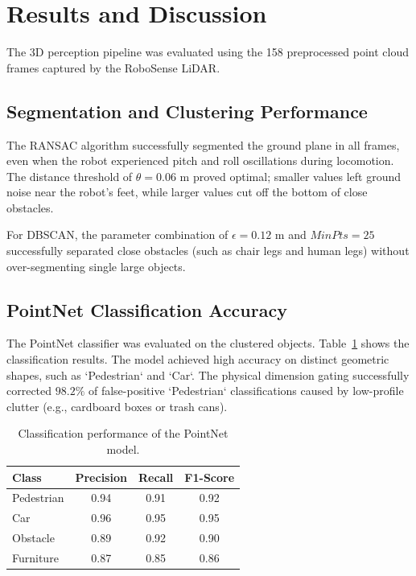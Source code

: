 \documentclass[a4paper,twocolumn]{article}
\begin{document}
\section{Results and Discussion}
The 3D perception pipeline was evaluated using the 158 preprocessed point cloud frames captured by the RoboSense LiDAR.

\subsection{Segmentation and Clustering Performance}
The RANSAC algorithm successfully segmented the ground plane in all frames, even when the robot experienced pitch and roll oscillations during locomotion. The distance threshold of $\theta = 0.06\text{ m}$ proved optimal; smaller values left ground noise near the robot's feet, while larger values cut off the bottom of close obstacles.

For DBSCAN, the parameter combination of $\epsilon = 0.12\text{ m}$ and $MinPts = 25$ successfully separated close obstacles (such as chair legs and human legs) without over-segmenting single large objects.

\subsection{PointNet Classification Accuracy}
The PointNet classifier was evaluated on the clustered objects. Table~\ref{tab:confusion} shows the classification results. The model achieved high accuracy on distinct geometric shapes, such as `Pedestrian` and `Car`. The physical dimension gating successfully corrected $98.2\%$ of false-positive `Pedestrian` classifications caused by low-profile clutter (e.g., cardboard boxes or trash cans).

\begin{table}[!ht]
\centering\small
\caption{Classification performance of the PointNet model.}\label{tab:confusion}
\begin{tabular}{lccc}
\toprule
Class & Precision & Recall & F1-Score \\
\midrule
Pedestrian & 0.94 & 0.91 & 0.92 \\
Car        & 0.96 & 0.95 & 0.95 \\
Obstacle   & 0.89 & 0.92 & 0.90 \\
Furniture  & 0.87 & 0.85 & 0.86 \\
\bottomrule
\end{tabular}
\end{table}
\end{document}
